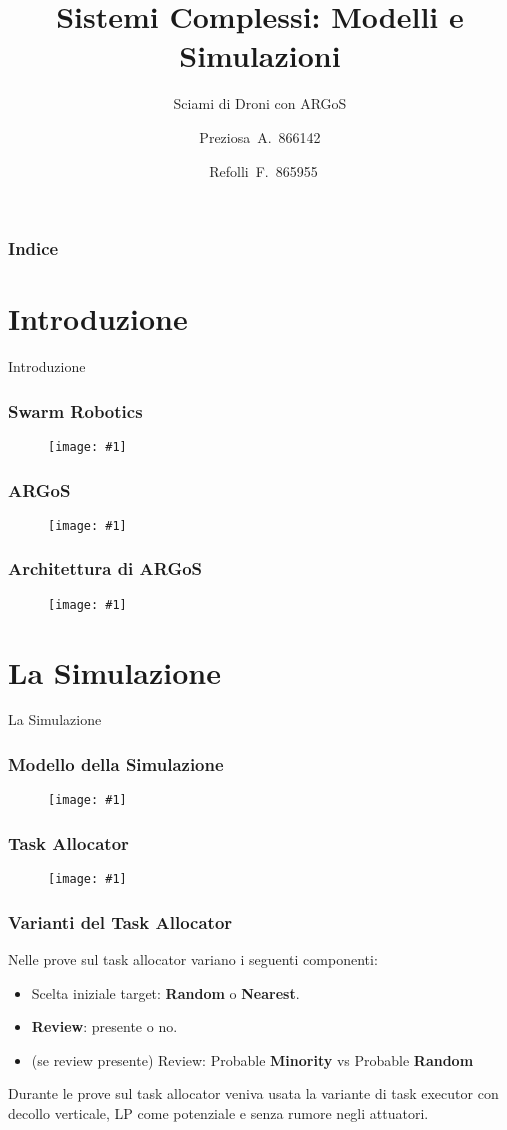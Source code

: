\documentclass{beamer}
\title{Sistemi Complessi: Modelli e Simulazioni}
\subtitle{Sciami di Droni con ARGoS}
\author{Preziosa~A.~866142 \and ~Refolli~F.~865955}
\newcommand{\putimage}[2] {
  \begin{figure}[H]
    \centering
    \texttt{[image: \#1]}
	\end{figure}
}
\begin{document}
\frame{\titlepage}

\begin{frame}
\frametitle{Indice}
\tableofcontents
\end{frame}

\section{Introduzione}
\begin{frame}
\centering
\Huge
Introduzione
\end{frame}

\begin{frame}
\frametitle{Swarm Robotics}
  \putimage{images/swarm\_robotics.png}{0.99}
\end{frame}

\begin{frame}
\frametitle{ARGoS}
\putimage{images/argos3.png}{0.85}
\end{frame}

\begin{frame}
\frametitle{Architettura di ARGoS}
\putimage{images/architecture.png}{0.85}
\end{frame}

\section{La Simulazione}
\begin{frame}
\centering
\Huge
La Simulazione
\end{frame}

\begin{frame}
\frametitle{Modello della Simulazione}
\putimage{images/simulation-model.png}{0.99}
\end{frame}

\begin{frame}
\frametitle{Task Allocator}
\putimage{images/task-allocator.png}{0.70}
\end{frame}

\begin{frame}
\frametitle{Varianti del Task Allocator}
Nelle prove sul task allocator variano i seguenti componenti:

\begin{itemize}
  \item Scelta iniziale target: \textbf{Random} o \textbf{Nearest}.
  \item \textbf{Review}: presente o no.
  \item (se review presente) Review: Probable \textbf{Minority} vs Probable \textbf{Random}
\end{itemize}

Durante le prove sul task allocator veniva usata la variante di task executor con decollo verticale, LP come potenziale e senza rumore negli attuatori.
\end{frame}
\end{document}
